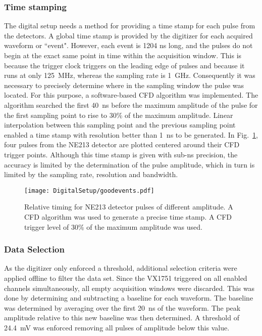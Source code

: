 \documentclass[main.tex]{subfiles}
\begin{document}
\subsubsection{Time stamping}
The digital setup needs a method for providing a time stamp for each pulse from the detectors. A global time stamp is provided by the digitizer for each acquired waveform or ``event". However, each event is 1204 ns long, and the pulses do not begin at the exact same point in time within the acquisition window. This is because the trigger clock triggers on the leading edge of pulses and because it runs at only \SI{125}{MHz}, whereas the sampling rate is \SI{1}{GHz}. Consequently it was necessary to precisely determine where in the sampling window the pulse was located. For this purpose, a software-based CFD algorithm was implemented. The algorithm searched the first \SI{40}{ns} before the maximum amplitude of the pulse for the first sampling point to rise to 30\% of the maximum amplitude. Linear interpolation between this sampling point and the previous sampling point enabled a time stamp with resolution better than \SI{1}{ns} to be generated. In Fig.~\ref{fig:cfd_trig}, four pulses from the NE213 detector are plotted centered around their CFD trigger points. Although this time stamp is given with sub-ns precision, the accuracy is limited by the determination of the pulse amplitude, which in turn is limited by the sampling rate, resolution and bandwidth. 

\begin{figure}[hb!]
    \centering
        \texttt{[image: DigitalSetup/goodevents.pdf]}
        \caption[Relative timing for NE213 detector pulses of different amplitude]{Relative timing for NE213 detector pulses of different amplitude. A CFD algorithm was used to generate a precise time stamp. A CFD trigger level of 30\% of the maximum amplitude was used.}
    \label{fig:cfd_trig} 
\end{figure}

\subsubsection{Data Selection}
As the digitizer only enforced a threshold, additional selection criteria were applied offline to filter the data set. Since the VX1751 triggered on all enabled channels simultaneously, all empty acquisition windows were discarded. This was done by determining and subtracting a baseline for each waveform. The baseline was determined by averaging over the first \SI{20}{ns} of the waveform. The peak amplitude relative to this new baseline was then determined. A threshold of \SI{24.4}{mV} was enforced removing all pulses of amplitude below this value.
\end{document}
